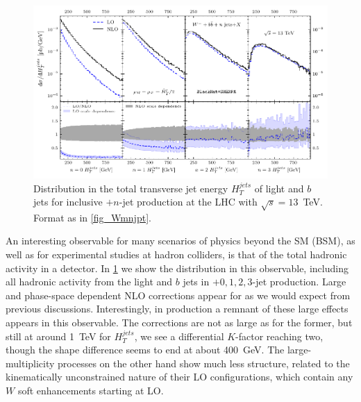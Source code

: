 \begin{figure}[ht]
  \centering
  \includegraphics[clip,scale=1.0]{plots/htjets.pdf}
  \caption{Distribution in the total transverse jet energy
    $H_T^{jets}$ of light  and $b$ jets for inclusive \Wbbm$+n$-jet
    production at the LHC with $\sqrt{s}=13$~TeV. Format as in \cref{fig_Wmnjpt}.}
    \label{fig_Wmnjht}
  \end{figure}

An interesting observable for many scenarios of physics beyond the SM (BSM), as
well as for experimental studies at hadron colliders, is that of the total
hadronic activity in a detector. In \cref{fig_Wmnjht} we show the distribution in
this observable, including all hadronic activity from the light and $b$ jets in
\Wbbm$+0,1,2,3$-jet production. Large and phase-space dependent NLO
corrections appear for \Wbb{} as we would expect from previous discussions.
Interestingly, in \Wbbj{} production a remnant of these large effects appears
in this observable. The corrections are not as large as for the former, but still at
around 1~TeV for $H_T^{jets}$, we see a differential $K$-factor reaching two,
though the shape difference seems to end at about 400~GeV. The
large-multiplicity processes on the other hand show much less
structure, related to the kinematically unconstrained nature of their
LO configurations, which contain any $W$ soft enhancements starting at LO.

